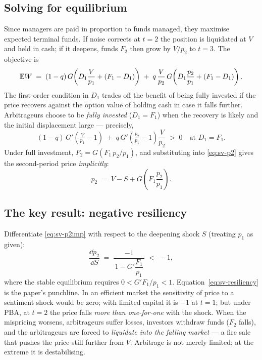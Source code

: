 \subsection*{Solving for equilibrium}
Since managers are paid in proportion to funds managed, they maximise expected terminal funds. If noise corrects at $t=2$ the position is liquidated at $V$ and held in cash; if it deepens, funds $F_2$ then grow by $V/p_2$ to $t=3$. The objective is
\begin{equation}
\mathbb{E} W \;=\; (1-q)\,G\!\left(D_1\frac{V}{p_1} + (F_1-D_1)\right) \;+\; q\,\frac{V}{p_2}\,G\!\left(D_1\frac{p_2}{p_1} + (F_1-D_1)\right). \label{eq:sv-EW}
\end{equation}
The first-order condition in $D_1$ trades off the benefit of being fully invested if the price recovers against the option value of holding cash in case it falls further. Arbitrageurs choose to be \emph{fully invested} ($D_1=F_1$) when the recovery is likely and the initial displacement large --- precisely,
\begin{equation}
(1-q)\,G'\!\left(\tfrac{V}{p_1}-1\right) \;+\; q\,G'\!\left(\tfrac{p_2}{p_1}-1\right)\frac{V}{p_2} \;>\;0 \quad\text{at } D_1=F_1. \label{eq:sv-fullinv}
\end{equation}
Under full investment, $F_2 = G(F_1\,p_2/p_1)$, and substituting into \eqref{eq:sv-p2} gives the second-period price \emph{implicitly}:
\begin{equation}
p_2 \;=\; V - S + G\!\left(F_1\frac{p_2}{p_1}\right). \label{eq:sv-p2imp}
\end{equation}

\subsection*{The key result: negative resiliency}
Differentiate \eqref{eq:sv-p2imp} with respect to the deepening shock $S$ (treating $p_1$ as given):
\begin{equation}
\frac{\dd p_2}{\dd S} \;=\; \frac{-1}{\,1 - G'\dfrac{F_1}{p_1}\,} \;<\; -1, \label{eq:sv-resiliency}
\end{equation}
where the stable equilibrium requires $0 < G'F_1/p_1 < 1$. Equation~\eqref{eq:sv-resiliency} is the paper's punchline. In an efficient market the sensitivity of price to a sentiment shock would be zero; with limited capital it is $-1$ at $t=1$; but under PBA, at $t=2$ the price falls \emph{more than one-for-one} with the shock. When the mispricing worsens, arbitrageurs suffer losses, investors withdraw funds ($F_2$ falls), and the arbitrageurs are forced to \emph{liquidate into the falling market} --- a fire sale that pushes the price still further from $V$. Arbitrage is not merely limited; at the extreme it is destabilising.


